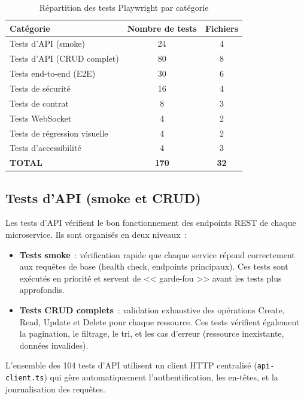 \begin{table}[H]
\centering
\caption{R\'{e}partition des tests Playwright par cat\'{e}gorie}
\label{tab:playwright-repartition}
\begin{tabularx}{\textwidth}{|X|c|c|}
\hline
\rowcolor{speedlineBlue!10}
\textbf{Cat\'{e}gorie} & \textbf{Nombre de tests} & \textbf{Fichiers} \\
\hline
Tests d'API (smoke) & 24 & 4 \\
\hline
Tests d'API (CRUD complet) & 80 & 8 \\
\hline
Tests end-to-end (E2E) & 30 & 6 \\
\hline
Tests de s\'{e}curit\'{e} & 16 & 4 \\
\hline
Tests de contrat & 8 & 3 \\
\hline
Tests WebSocket & 4 & 2 \\
\hline
Tests de r\'{e}gression visuelle & 4 & 2 \\
\hline
Tests d'accessibilit\'{e} & 4 & 3 \\
\hline
\rowcolor{speedlineGreen!10}
\textbf{TOTAL} & \textbf{170} & \textbf{32} \\
\hline
\end{tabularx}
\end{table}

\subsection{Tests d'API (smoke et CRUD)}

Les tests d'API v\'{e}rifient le bon fonctionnement des endpoints REST de
chaque microservice. Ils sont organis\'{e}s en deux niveaux~:

\begin{itemize}[leftmargin=*]
  \item \textbf{Tests smoke}~: v\'{e}rification rapide que chaque service
    r\'{e}pond correctement aux requ\^{e}tes de base (health check, endpoints
    principaux). Ces tests sont ex\'{e}cut\'{e}s en priorit\'{e} et servent de
    << gar\-de-fou >> avant les tests plus approfondis.
  \item \textbf{Tests CRUD complets}~: validation exhaustive des
    op\'{e}rations Create, Read, Update et Delete pour chaque ressource.
    Ces tests v\'{e}rifient \'{e}galement la pagination, le filtrage, le tri,
    et les cas d'erreur (ressource inexistante, donn\'{e}es invalides).
\end{itemize}

L'ensemble des 104 tests d'API utilisent un client HTTP centralis\'{e}
(\texttt{api-client.ts}) qui g\`{e}re automatiquement l'authentification,
les en-t\^{e}tes, et la journalisation des requ\^{e}tes.

